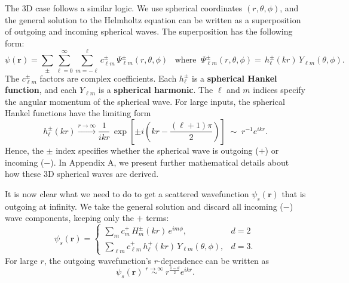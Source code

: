 \documentclass[pra,12pt]{revtex4}
\begin{document}
The 3D case follows a similar logic.  We use spherical coordinates
$(r,\theta,\phi)$, and the general solution to the Helmholtz equation
can be written as a superposition of outgoing and incoming spherical
waves.  The superposition has the following form:
$$\psi(\mathbf{r})=\sum_{\pm}\sum_{\ell=0}^\infty\sum_{m=-\ell}^\ell c_{\ell m}^\pm \,\Psi_{\ell m}^\pm(r,\theta,\phi)\;\;\;\mathrm{where}\;\;\Psi_{\ell m}^\pm(r,\theta,\phi) = \,h_\ell^\pm(kr)\,Y_{\ell m}(\theta,\phi).$$
The $c_{\ell m}^\pm$ factors are complex coefficients.  Each
$h_\ell^\pm$ is a \textbf{spherical Hankel function}, and each
$Y_{\ell m}$ is a \textbf{spherical harmonic}.  The $\ell$ and $m$
indices specify the angular momentum of the spherical wave.  For large
inputs, the spherical Hankel functions have the limiting form
$$h_\ell^\pm(kr) \overset{r\rightarrow\infty}{\longrightarrow} \frac{1}{ikr}\,\exp\left[\pm i\left(kr-\frac{(\ell+1)\pi}{2}\right)\right] \;\sim\; r^{-1} e^{ikr}.$$
Hence, the $\pm$ index specifies whether the spherical wave is
outgoing ($+$) or incoming ($-$).  In Appendix A, we present further
mathematical details about how these 3D spherical waves are
derived.

It is now clear what we need to do to get a scattered wavefunction
$\psi_s(\mathbf{r})$ that is outgoing at infinity.  We take the
general solution and discard all incoming ($-$) wave components,
keeping only the $+$ terms:
$$\psi_s(\mathbf{r}) = \begin{cases} \displaystyle\sum_{m} c_m^+\,H_m^\pm(kr)\,e^{im\phi}, &d=2\\ \displaystyle\sum_{\ell m} c_{\ell m}^+\,h_\ell^+(kr)\,Y_{\ell m}(\theta,\phi),&d=3.\end{cases}$$
For large $r$, the outgoing wavefunction's $r$-dependence can be
written as
$$\psi_s(\mathbf{r}) \; \overset{r\rightarrow\infty}{\sim} \; r^{\frac{1-d}{2}} e^{ikr}.$$
\end{document}
